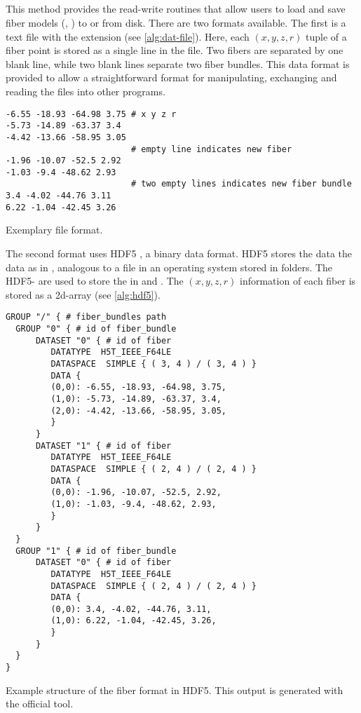\subsection{}
%
This method provides the read-write routines that allow users to load and save fiber models (\ie{}, ) to or from disk.
There are two formats available.
The first is a text file with the extension  (see \cref{alg:dat-file}).
Here, each $(x,y,z,r)$ tuple of a fiber point is stored as a single line in the file.
Two fibers are separated by one blank line, while two blank lines separate two fiber bundles.
This data format is provided to allow a straightforward  format for manipulating, exchanging and reading the files into other programs.
\par
%
\begin{lstfloat}[!ht]
\begin{lstlisting}
-6.55 -18.93 -64.98 3.75 # x y z r
-5.73 -14.89 -63.37 3.4
-4.42 -13.66 -58.95 3.05
                         # empty line indicates new fiber
-1.96 -10.07 -52.5 2.92
-1.03 -9.4 -48.62 2.93
                         # two empty lines indicates new fiber bundle
3.4 -4.02 -44.76 3.11
6.22 -1.04 -42.45 3.26
\end{lstlisting}
\caption[]{Exemplary  file format.}\label{alg:dat-file}
\end{lstfloat}
%
The second format uses \ac{HDF5} \cite{hdf5}, a binary data format.
\ac{HDF5} stores the data the data as  in , analogous to a file in an operating system stored in folders.
The \ac{HDF5}- are used to store the  in  and .
The $(x,y,z,r)$ information of each fiber is stored as a 2d-array (see \cref{alg:hdf5}).
%
\begin{lstfloat}[!ht]
\begin{lstlisting}
GROUP "/" { # fiber_bundles path
  GROUP "0" { # id of fiber_bundle
      DATASET "0" { # id of fiber
         DATATYPE  H5T_IEEE_F64LE
         DATASPACE  SIMPLE { ( 3, 4 ) / ( 3, 4 ) }
         DATA {
         (0,0): -6.55, -18.93, -64.98, 3.75,
         (1,0): -5.73, -14.89, -63.37, 3.4,
         (2,0): -4.42, -13.66, -58.95, 3.05,
         }
      }
      DATASET "1" { # id of fiber
         DATATYPE  H5T_IEEE_F64LE
         DATASPACE  SIMPLE { ( 2, 4 ) / ( 2, 4 ) }
         DATA {
         (0,0): -1.96, -10.07, -52.5, 2.92,
         (1,0): -1.03, -9.4, -48.62, 2.93,
         }
      }
  }
  GROUP "1" { # id of fiber_bundle
      DATASET "0" { # id of fiber
         DATATYPE  H5T_IEEE_F64LE
         DATASPACE  SIMPLE { ( 2, 4 ) / ( 2, 4 ) }
         DATA {
         (0,0): 3.4, -4.02, -44.76, 3.11,
         (1,0): 6.22, -1.04, -42.45, 3.26,
         }
      }
  }
}
\end{lstlisting}
\caption[]{Example structure of the fiber format in \ac{HDF5}. This output is generated with the official  tool.}
\label{alg:hdf5}
\end{lstfloat}
%
%
%
